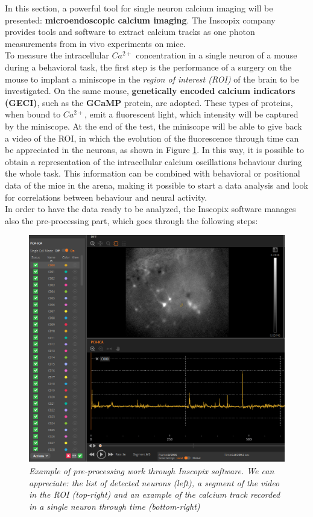 \documentclass[12pt, a4paper]{report}
\begin{document}
In this section, a powerful tool for single neuron calcium imaging will be presented: \textbf{microendoscopic calcium imaging}. The Inscopix company \cite{11} %
 provides tools and software to extract calcium tracks as one photon measurements from in vivo experiments on mice.\\
To measure the intracellular $Ca^{2+}$ concentration in a single neuron of a mouse during a behavioral task, the first step is the performance of a surgery on the mouse to implant a miniscope in the \textit{region of interest (ROI)} of the brain to be investigated. On the same mouse, \textbf{genetically encoded calcium indicators (GECI)}, such as the \textbf{GCaMP} protein, are adopted. These types of proteins, when bound to $Ca^{2+}$, emit a fluorescent light, which intensity will be captured by the miniscope. At the end of the test, the miniscope will be able to give back a video of the ROI, in which the evolution of the fluorescence through time can be appreciated  in the neurons, as shown in Figure \ref{inscopix}. In this way, it is possible to obtain a representation of the intracellular calcium oscillations behaviour during the whole task. This information can be combined with behavioral or positional data of the mice in the arena, making it possible to start a data analysis and look for correlations between behaviour and neural activity.\\
In order to have the data ready to be analyzed, the Inscopix software manages also the pre-processing part, which goes through the following steps:

\begin{figure}[H]
	\begin{center}
		\includegraphics[scale=.80]{Inscopix2.png} 
	\end{center} 
	\caption{\textit{Example of pre-processing work through Inscopix software. We can appreciate: the list of detected neurons (left), a segment of the video in the ROI (top-right) and an example of the calcium track recorded in a single neuron through time (bottom-right)}}
	\label{inscopix}
\end{figure}
\end{document}
